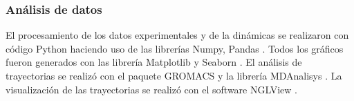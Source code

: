 \subsubsection{Análisis de datos}

El procesamiento de los datos experimentales y de la dinámicas se realizaron con código Python haciendo uso de las librerías  Numpy, Pandas \citep{Harris2020, McKinney2010}. Todos los gráficos fueron generados con las librería Matplotlib y Seaborn \citep{Hunter2007, Waskom2021}. El análisis de trayectorias se realizó con el paquete GROMACS y la librería MDAnalisys \citep{Jo2011}. La visualización de las trayectorias se realizó con el software NGLView \citep{Nguyen2018}.
